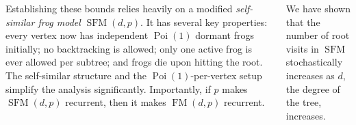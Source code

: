 \documentclass[25pt,margin=1in,innermargin=-7in,blockverticalspace=0in]{tikzposter}
\newcommand{\edit}[1]{\textcolor{red}{#1}}
\newcommand{\Poi}{\operatorname{Poi}}
\newcommand{\SFM}{\operatorname{SFM}}
\newcommand{\FM}{\operatorname{FM}}
\begin{document}
\begin{columns}
{    Establishing these bounds relies heavily on a modified \emph{self-similar frog model} $\SFM(d,p)$. It has several key properties: every vertex now has independent $\Poi(1)$ dormant frogs initially; no backtracking is allowed; only one active frog is ever allowed per subtree; and frogs die upon hitting the root. The self-similar structure and the $\Poi(1)$-per-vertex setup simplify the analysis significantly. %
    Importantly, if $p$ makes $\SFM(d,p)$ recurrent, then it makes $\FM(d,p)$ recurrent.
    
    We have shown that the number of root visits in $\SFM$ stochastically increases as $d$, the degree of the tree, increases.
    }



\end{columns}
\end{document}
